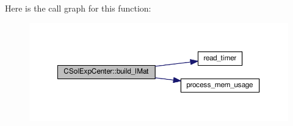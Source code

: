 Here is the call graph for this function\-:\nopagebreak
\begin{figure}[H]
\begin{center}
\leavevmode
\includegraphics[width=350pt]{classCSolExpCenter_aff368c517d5f7a1cebd836179cd0cc1d_cgraph}
\end{center}
\end{figure}


